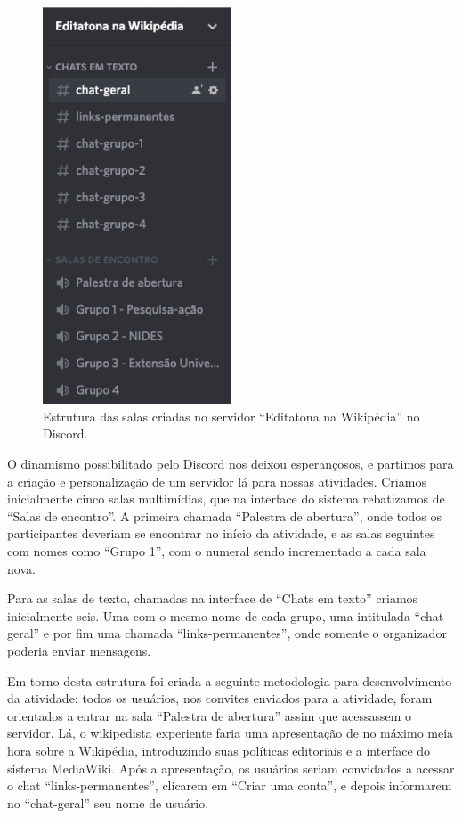 \begin{figure}[H]
    \centering
    \includegraphics[width=0.5\textwidth]{Images/discord_channels.png}
    \caption{Estrutura das salas criadas no servidor “Editatona na Wikipédia” no Discord.}
    \label{fig:estrutura_discord}
\end{figure}

 O dinamismo possibilitado pelo Discord nos deixou esperançosos, e partimos para a criação e personalização de um servidor lá para nossas atividades. Criamos inicialmente cinco salas multimídias, que na interface do sistema rebatizamos de “Salas de encontro”. A primeira chamada “Palestra de abertura”, onde todos os participantes deveriam se encontrar no início da atividade, e as salas seguintes com nomes como “Grupo 1”, com o numeral sendo incrementado a cada sala nova.
 
 Para as salas de texto, chamadas na interface de “Chats em texto” criamos inicialmente seis. Uma com o mesmo nome de cada grupo, uma intitulada “chat-geral” e por fim uma chamada “links-permanentes”, onde somente o organizador poderia enviar mensagens.
 
 Em torno desta estrutura foi criada a seguinte metodologia para desenvolvimento da atividade: todos os usuários, nos convites enviados para a atividade, foram orientados a entrar na sala “Palestra de abertura” assim que acessassem o servidor. Lá, o wikipedista experiente faria uma apresentação de no máximo meia hora sobre a Wikipédia, introduzindo suas políticas editoriais e a interface do sistema MediaWiki. Após a apresentação, os usuários seriam convidados a acessar o chat “links-permanentes”, clicarem em “Criar uma conta”, e depois informarem no “chat-geral” seu nome de usuário.
 
